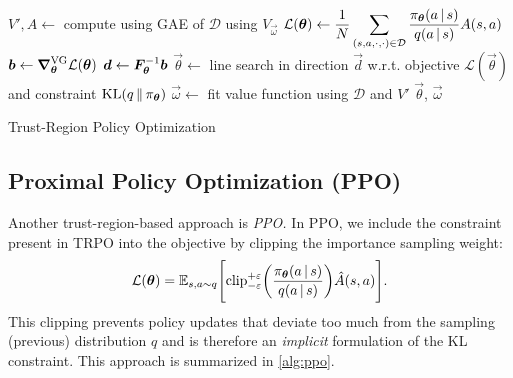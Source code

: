 			\begin{algorithm}  \DontPrintSemicolon
				\(\displaystyle V', A \gets \) compute using \acs{GAE} of \(\mathcal{D}\) using \(V_{\vec{\omega}}\) \;
				\(\displaystyle \mathcal{L}(\bm{\theta}) \gets \frac{1}{N} \sum_{(s, a, \cdot, \cdot) \in \mathcal{D}} \frac{\pi_{\bm{\theta}}(a \,\vert\, s)}{q(a \,\vert\, s)} A(s, a) \)  \quad\quad{}
				\(\displaystyle \bm{b} \gets \grad_{\bm{\theta}}^\mathrm{VG} \mathcal{L}(\bm{\theta}) \)  \quad{}
				\(\displaystyle \bm{d} \gets \bm{F}_{\bm{\theta}}^{-1} \bm{b} \)  \quad{}
				\(\displaystyle \vec{\theta} \gets \) line search in direction \(\vec{d}\) w.r.t. objective \( \mathcal{L}(\vec{\theta}) \) and constraint \( \operatorname{KL}(q \,\Vert\, \pi_{\bm{\theta}}) \) \;
				\(\displaystyle \vec{\omega} \gets \) fit value function using \(\mathcal{D}\) and \(V'\) \;
				\Return \(\vec{\theta}\), \(\vec{\omega}\)
				\caption{Trust-Region Policy Optimization}
				\label{alg:trpo}
			\end{algorithm}

		\subsection{Proximal Policy Optimization (\acs{PPO})}
			Another trust-region-based approach is \emph{\ac{PPO}.} In \ac{PPO}, we include the constraint present in \ac{TRPO} into the objective by clipping the importance sampling weight:
			\begin{equation}
				\mathcal{L}(\bm{\theta}) = \mathbb{E}_{s, a \sim q}\Biggl[ \operatorname{clip}_{-\varepsilon}^{+\varepsilon}\biggl( \frac{\pi_{\bm{\theta}}(a \,\vert\, s)}{q(a \,\vert\, s)} \biggr) \hat{A}(s, a) \Biggr].
			\end{equation}
			This clipping prevents policy updates that deviate too much from the sampling (previous) distribution \(q\) and is therefore an \emph{implicit} formulation of the \ac{KL} constraint. This approach is summarized in \autoref{alg:ppo}.

